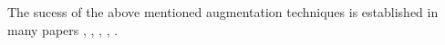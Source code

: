 The sucess of the above mentioned augmentation techniques is established in many papers \cite{perez2017effectivenessdataaugmentationimage}, \cite{NIPS2012_c399862d}, \cite{Ying2019overfittinganditssolutions}, \cite{shorten2019survey}, \cite{WanLiZeiler2013}.









\newpage
